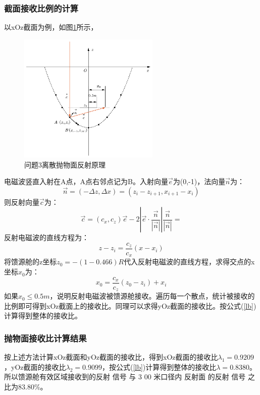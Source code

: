 \documentclass[withoutpreface,bwprint]{cumcmthesis} %
\begin{document}
	\subsubsection{截面接收比例的计算}
	以xOz截面为例，如图\ref{问题3离散抛物面反射}所示，
				\begin{figure}[!htp]
		\centering
		\includegraphics[width=0.6\textwidth]{问题3离散抛物面反射}
		\caption{问题3离散抛物面反射原理}
		\label{问题3离散抛物面反射}
	\end{figure}
	电磁波竖直入射在A点，A点右邻点记为B。入射向量$\overrightarrow{e}$为(0,-1)，法向量$\overrightarrow{n}$为：
	\begin{equation}\label{n}
	\overrightarrow{n}=(-\Delta z,\Delta x)=(z_{i}-z_{i+1},x_{i+1}-x_i)
	\end{equation}
	则反射向量$\overrightarrow{c}$为：
	\begin{equation}\label{c}
	\overrightarrow{c}=(c_x,c_z)\overrightarrow{e}-2\left| \overrightarrow{e}\cdot \frac{\overrightarrow{n}}{\left| \overrightarrow{n} \right|} \right|\frac{\overrightarrow{n}}{\left| \overrightarrow{n} \right|}=
	\end{equation}
	反射电磁波的直线方程为：
	\begin{equation}\label{fc}
	z-z_i=\frac{c_z}{c_x}\left( x-x_i \right)
	\end{equation}
	将馈源舱的z坐标$z_0=-(1-0.466)R$代入反射电磁波的直线方程，求得交点的x坐标$x_0$为：
	\begin{equation}\label{x0}
	x_0=\frac{c_x}{c_z}\left( z_0-z_i \right) +x_i
	\end{equation}
	如果$x_0\leqslant 0.5m$，说明反射电磁波被馈源舱接收。遍历每一个散点，统计被接收的比例即可得到xOz截面上的接收比。同理可以求得yOz截面的接收比。按公式(\ref{lb})计算得到整体的接收比。
	
	\subsubsection{抛物面接收比计算结果}
	按上述方法计算xOz截面和yOz截面的接收比，得到xOz截面的接收比$\lambda_1=0.9209$，yOz截面的接收比$\lambda_2=0.9099$，按公式(\ref{lb})计算得到整体的接收比$\lambda=0.8380$。所以馈源舱有效区域接收到的反射 信号 与 3 00 米口径内 反射面 的反射 信号 之比为$83.80\%$。
	
\end{document}
